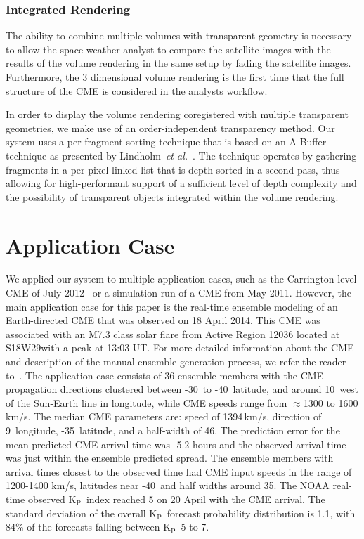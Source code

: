 \documentclass[journal]{vgtc}                %
\def\etal{\textit{et al.}}
\newcommand{\kpIndex}{$\textrm{K}_\textrm{P}$}
\begin{document}
\subsubsection{Integrated Rendering} \label{sec:integration}
The ability to combine multiple volumes with transparent geometry is necessary to allow the space weather analyst to compare the satellite images with the results of the volume rendering in the same setup by fading the satellite images. Furthermore, the 3 dimensional volume rendering is the first time that the full structure of the CME is considered in the analysts workflow.

In order to display the volume rendering coregistered with multiple transparent geometries, we make use of an order-independent transparency method. Our system uses a per-fragment sorting technique that is based on an A-Buffer technique as presented by Lindholm~\etal~\cite{Lindholm:2014fm}. The technique operates by gathering fragments in a per-pixel linked list that is depth sorted in a second pass, thus allowing for high-performant support of a sufficient level of depth complexity and the possibility of transparent objects integrated within the volume rendering. 

\section{Application Case} \label{sec:applicationcase}
We applied our system to multiple application cases, such as the Carrington-level CME of July 2012~\cite{baker2013major} or a simulation run of a CME from May 2011. However, the main application case for this paper is the real-time ensemble modeling of an Earth-directed CME that was observed on 18 April 2014. This CME was associated with an M7.3 class solar flare from Active Region 12036 located at S18\degree W29\degree with a peak at 13:03 UT. For more detailed information about the CME and description of the manual ensemble generation process, we refer the reader to~\cite{mays2015ensemble}. The application case consists of 36 ensemble members with the CME propagation directions clustered between -30\degree\ to -40\degree\ latitude, and around 10\degree\ west of the Sun-Earth line in longitude, while CME speeds range from $\approx$1300 to 1600 km/s. The median CME parameters are: speed of 1394\,km/s, direction of 9\degree\ longitude, -35\degree\ latitude, and a half-width of 46\degree . The prediction error for the mean predicted CME arrival time was -5.2 hours and the observed arrival time was just within the ensemble predicted spread. The ensemble members with arrival times closest to the observed time had CME input speeds in the range of 1200-1400 km/s, latitudes near -40\degree\ and half widths around 35\degree . The NOAA real-time observed \kpIndex\ index reached 5 on 20 April with the CME arrival. The standard deviation of the overall \kpIndex\ forecast probability distribution is 1.1, with 84\% of the forecasts falling between \kpIndex\ 5 to 7.
\end{document}
